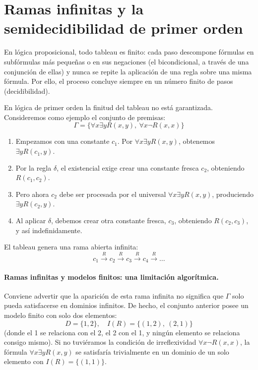 \section{Ramas infinitas y la semidecidibilidad de primer orden}\label{sec:ramas-infinitas}

En lógica proposicional, todo tableau es finito: cada paso descompone
fórmulas en subfórmulas más pequeñas o en sus negaciones (el
bicondicional, a través de una conjunción de ellas) y nunca se repite la aplicación
de una regla sobre una misma fórmula. Por ello, el proceso concluye
siempre en un número finito de pasos (decidibilidad).

En lógica de primer orden la finitud del tableau no está
garantizada. Consideremos como ejemplo el conjunto de premisas:  
\[
\Gamma = \{\forall x \exists y R(x, y), \ \forall x \neg R(x, x)\}
\]
\begin{enumerate}
    \item Empezamos con una constante $c_1$. Por $\forall x \exists y R(x, y)$, obtenemos $\exists y R(c_1, y)$.
    \item Por la regla $\delta$, el existencial exige crear una constante fresca $c_2$, obteniendo $R(c_1, c_2)$.
    \item Pero ahora $c_2$ debe ser procesada por el universal $\forall x \exists y R(x, y)$, produciendo $\exists y R(c_2, y)$.
    \item Al aplicar $\delta$, debemos crear otra constante fresca, $c_3$, obteniendo $R(c_2, c_3)$, y así indefinidamente.
\end{enumerate}

El tableau genera una rama abierta infinita:
\[
c_1 \xrightarrow{R} c_2 \xrightarrow{R} c_3 \xrightarrow{R} c_4 \xrightarrow{R} \dots
\]

\paragraph{Ramas infinitas y modelos finitos: una limitación algorítmica.}
Conviene advertir que la aparición de esta rama infinita no significa
que $\Gamma$ solo pueda satisfacerse en dominios infinitos. De hecho,
el conjunto anterior posee un modelo finito con solo dos elementos:
\[
D = \{1, 2\}, \quad I(R) = \{(1, 2), \ (2, 1)\}
\]
(donde el 1 se relaciona con el 2, el 2 con el 1, y ningún elemento se relaciona consigo mismo). Si no tuviéramos la condición de irreflexividad $\forall x \neg R(x, x)$, la fórmula $\forall x \exists y R(x, y)$ se satisfaría trivialmente en un dominio de un solo elemento con $I(R) = \{(1, 1)\}$.

